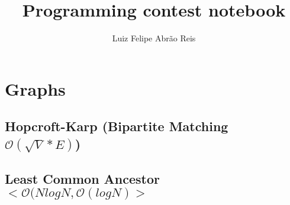 \documentclass[10pt, a4paper, twoside, notitlepage]{article}
\title{Programming contest notebook}
\author{Luiz Felipe Abrão Reis}
\date{ }
\begin{document}
\begin{titlepage}
\maketitle
\tableofcontents
\end{titlepage}


%
%
%

\section{Graphs}

\subsection{Hopcroft-Karp (Bipartite Matching $\mathcal{O}(\sqrt{V}*E)$)}



\newpage

\subsection{Least Common Ancestor $<\mathcal{O}(N logN, \mathcal{O}(logN)>$}



\newpage
\end{document}
